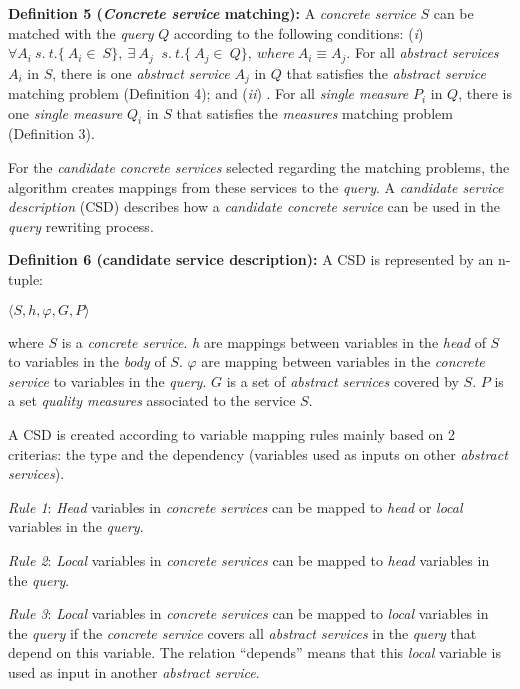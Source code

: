 \noindent \textbf{Definition 5 (\textit{Concrete service} matching):} 
A \textit{concrete service} $S$ can be matched with the \textit{query} $Q$ according to the following conditions:
(\textit{i}) $\forall A_{i}  \ s. \ t. \lbrace\ A_{i} \in \ S\rbrace, \ \exists \ A_{j} \ $ $s. \ t. \lbrace\ A_{j} \in \ Q\rbrace, \ where \ A_{i} \equiv A_{j}.$ For all \textit{abstract services} $A_{i}$ in $S$, there is one \textit{abstract service} $A_{j}$ in $Q$ that satisfies the \textit{abstract service} matching problem (Definition 4); and
(\textit{ii}) . For all \textit{single measure} $P_{i}$ in $Q$, there is one \textit{single measure} $Q_{i}$ in $S$ that satisfies the \textit{measures} matching problem (Definition 3).

For the \textit{candidate concrete services} selected regarding the matching problems, the algorithm creates mappings from these services to the \textit{query}.
A \textit{candidate service description} (CSD) describes how a \textit{candidate concrete service} can be used in the \textit{query} rewriting process.

\noindent \textbf{Definition 6 (candidate service description):} A CSD is represented by an n-tuple:
\begin{center}
$\langle S, h, \varphi, G, P\rangle$
\end{center}
where $S$ is a \textit{concrete service}. 
\textit{h} are mappings between variables in the \textit{head} of $S$ to variables in the \textit{body} of $S$. 
$\varphi$ are mapping between variables in the \textit{concrete service} to variables in the \textit{query}.
$G$ is a set of \textit{abstract services} covered by $S$. 
$P$ is a set \textit{quality measures} associated to the service $S$. 

A CSD is created according to variable mapping rules mainly based on 2 criterias: the type and the dependency (variables used as inputs on other \textit{abstract services}). 
\begin{description}
\item \textit{Rule 1}: \textit{Head} variables in \textit{concrete services} can be mapped to \textit{head} or \textit{local} variables in the \textit{query}.
\item \textit{Rule 2}: \textit{Local} variables in \textit{concrete services} can be mapped to \textit{head} variables in the \textit{query}.
\item \textit{Rule 3}: \textit{Local} variables in \textit{concrete services} can be mapped to \textit{local}
 variables in the \textit{query} if the \textit{concrete service} covers all \textit{abstract services} in the \textit{query} that depend on this variable. The relation ``depends''  means that this \textit{local} variable is used as input in another \textit{abstract service}. 
\end{description}